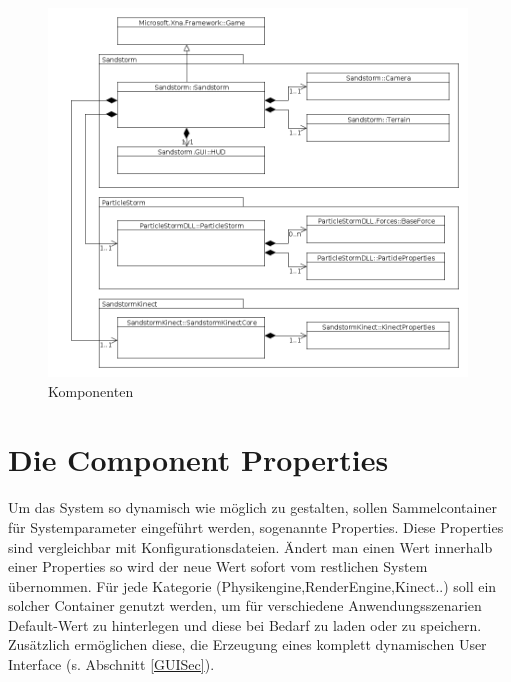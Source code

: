 \begin{Spacing}{\mylinespace}
\begin{figure}[h!]
	\centering
	\vspace*{20px}
	\includegraphics[width=0.99\textwidth]{graphics/overview.png}
	\caption{Komponenten}
	\label{fig:component}
\end{figure}

\section{Die Component Properties} \label{PropSec}
Um das  System so dynamisch wie möglich zu gestalten, sollen Sammelcontainer für Systemparameter eingeführt werden, sogenannte Properties.
Diese Properties sind vergleichbar mit Konfigurationsdateien. Ändert man einen Wert innerhalb einer Properties so wird der neue Wert sofort vom restlichen System übernommen. Für jede Kategorie (Physikengine,RenderEngine,Kinect..) soll ein solcher Container genutzt werden, um für verschiedene Anwendungsszenarien Default-Wert zu hinterlegen und diese bei Bedarf zu laden oder zu speichern. Zusätzlich ermöglichen diese, die Erzeugung eines komplett dynamischen User Interface (s. Abschnitt \ref{GUISec}).

\end{Spacing}
\newpage
\clearpage
